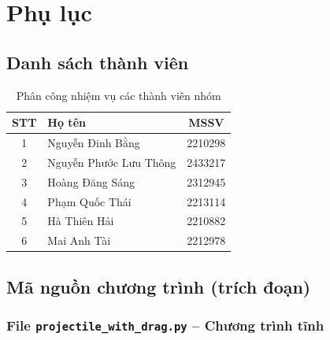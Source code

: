 \section{Phụ lục}

\subsection{Danh sách thành viên}

\begin{table}[H]
\centering
\caption{Phân công nhiệm vụ các thành viên nhóm}
\renewcommand{\arraystretch}{1.4}
\begin{tabular}{|c|l|c|}
\hline
\textbf{STT} & \textbf{Họ tên} & \textbf{MSSV} \\
\hline
1 & Nguyễn Đinh Bằng & 2210298 \\
\hline
2 & Nguyễn Phước Lưu Thông & 2433217 \\
\hline
3 & Hoàng Đăng Sáng & 2312945 \\
\hline
4 & Phạm Quốc Thái & 2213114 \\
\hline
5 & Hà Thiên Hải & 2210882 \\
\hline
6 & Mai Anh Tài & 2212978 \\
\hline
\end{tabular}
\end{table}


\subsection{Mã nguồn chương trình (trích đoạn)}

\subsubsection{File \texttt{projectile\_with\_drag.py} -- Chương trình tĩnh}

